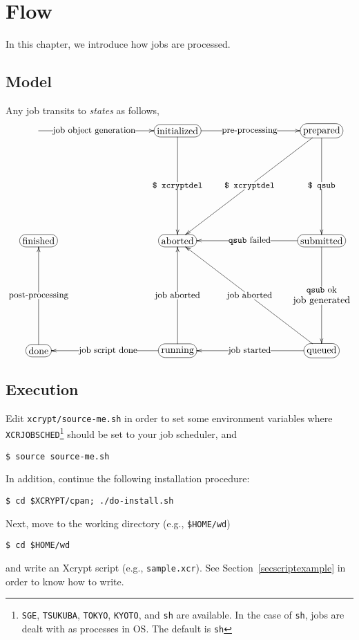 \documentclass[a4paper,10pt]{report}
\begin{document}
\chapter{Flow}

In this chapter, we introduce how jobs are processed.

\section{Model}\label{sec:states}

Any job transits to \textit{states} as follows,
\[
\entrymodifiers={+[F-:<10pt>]}
\xymatrix@=100pt{
  *{} \ar[r]|(.4){\txt{\small job object generation}} &
  \txt{initialized} \ar[r]|{\txt{\small pre-processing}} \ar[d]|{\txt{\small \texttt{\$ xcryptdel}}}&
  \txt{prepared} \ar[d]|{\txt{\small \texttt{\$ qsub}}} \ar[ld]|{\txt{\small \texttt{\$ xcryptdel}}}\\
  \txt{finished} &
  \txt{aborted} &
  \txt{submitted} \ar[d]|{\txt{\small \texttt{qsub} ok\\job generated}} \ar[l]|{\txt{\small \texttt{qsub} failed}}\\
  \txt{done} \ar[u]|{\txt{\small post-processing}} &
  \txt{running} \ar[l]|{\txt{\small job script done}} \ar[u]|{\txt{\small job aborted}} &
  \txt{queued} \ar[l]|{\txt{\small job started}} \ar[lu]|{\txt{\small job aborted}}
}
\]

\section{Execution}

Edit \texttt{xcrypt/source-me.sh} in order to set some environment
variables where \texttt{XCRJOBSCHED}\footnote{\texttt{SGE},
\texttt{TSUKUBA}, \texttt{TOKYO}, \texttt{KYOTO}, and \texttt{sh} are
available.  In the case of \texttt{sh}, jobs are dealt with as
processes in OS.  The default is \texttt{sh}} should be set to your
job scheduler, and
\begin{screen}
\texttt{\$ source source-me.sh}
\end{screen}
In addition, continue the following installation procedure:
\begin{screen}
\texttt{\$ cd \$XCRYPT/cpan; ./do-install.sh}
\end{screen}

Next, move to the working directory (e.g., \texttt{\$HOME/wd})
\begin{screen}
\texttt{\$ cd \$HOME/wd}
\end{screen}
and write an Xcrypt script (e.g., \texttt{sample.xcr}).  See
Section~\ref{secscriptexample} in order to know how to write.
\end{document}
